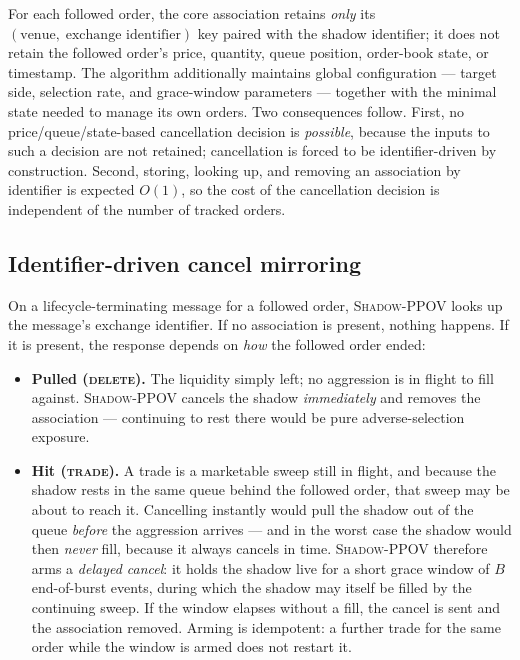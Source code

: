 \documentclass[11pt]{article}
\newcommand{\pov}{\textsc{Shadow-PPOV}}
\begin{document}
For each followed order, the core association retains \emph{only} its
$(\text{venue},\;\text{exchange identifier})$ key paired with the shadow
identifier; it
does not retain the followed order's price, quantity, queue position, order-book
state, or timestamp.
The algorithm additionally maintains global configuration --- target side,
selection rate, and grace-window parameters --- together with the minimal state
needed to manage its own orders. Two consequences follow. First, no
price/queue/state-based
cancellation decision is \emph{possible}, because the inputs to such a
decision are not retained; cancellation is forced to be identifier-driven by
construction. Second, storing, looking up, and removing an association by
identifier is expected $O(1)$, so the cost of the cancellation decision is
independent of the number of tracked orders.

\subsection{Identifier-driven cancel mirroring}
\label{sec:cancel}

On a lifecycle-terminating message for a followed order, \pov{} looks up the
message's exchange identifier. If no association is present, nothing happens.
If it is present, the response depends on \emph{how} the followed order ended:

\begin{itemize}[leftmargin=1.4em]
  \item \textbf{Pulled (\textsc{delete}).} The liquidity simply left; no
  aggression is in flight to fill against. \pov{} cancels the shadow
  \emph{immediately} and removes the association --- continuing to rest there
  would be pure adverse-selection exposure.
  \item \textbf{Hit (\textsc{trade}).} A trade is a marketable sweep still in
  flight, and because the shadow rests in the same queue behind the followed
  order, that sweep may be about to reach it. Cancelling instantly would pull
  the shadow out of the queue \emph{before} the aggression arrives --- and in
  the worst case the shadow would then \emph{never} fill, because it always
  cancels in time. \pov{} therefore arms a \emph{delayed cancel}: it holds the
  shadow live for a short grace window of $B$ end-of-burst events, during which
  the shadow may itself be filled by the continuing sweep. If the window
  elapses without a fill, the cancel is sent and the association removed. Arming
  is idempotent: a further trade for the same order while the window is armed
  does not restart it.
\end{itemize}
\end{document}
